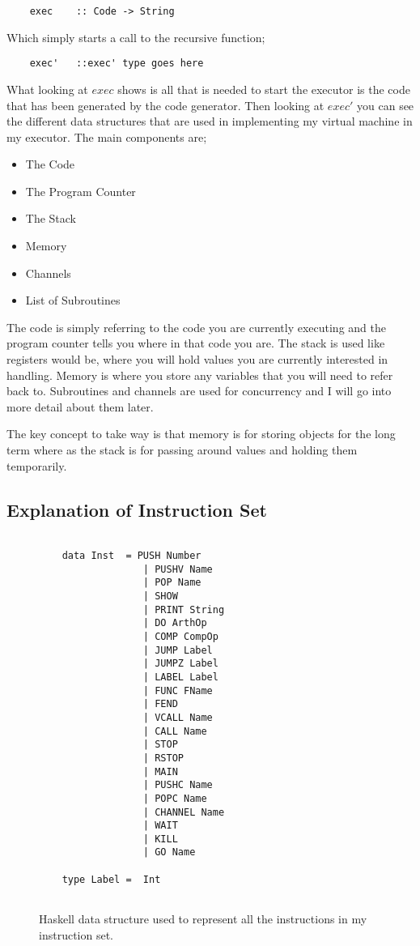 \begin{lstlisting}
	exec	:: Code -> String
\end{lstlisting}

Which simply starts a call to the recursive function;

\begin{lstlisting}
	exec' 	::exec' type goes here 
\end{lstlisting}

\newpage

What looking at $exec$ shows is all that is needed to start the executor is the code that has been generated by the code generator. Then looking at $exec'$ you can see the different data structures that are used in implementing my virtual machine in my executor. The main components are;

\begin{itemize}
\item The Code
\item The Program Counter
\item The Stack
\item Memory
\item Channels
\item List of Subroutines
\end{itemize}

The code is simply referring to the code you are currently executing and the program counter tells you where in that code you are. The stack is used like registers would be, where you will hold values you are currently interested in handling. Memory is where you store any variables that you will need to refer back to. Subroutines and channels are used for concurrency and I will go into more detail about them later. 

The key concept to take way is that memory is for storing objects for the long term where as the stack is for passing around values and holding them temporarily.

\subsection{Explanation of Instruction Set}

\begin{figure}[h]
\centering
\begin{lstlisting}

	data Inst  = PUSH Number
	              | PUSHV Name
	              | POP Name
	              | SHOW
	              | PRINT String  
      		      | DO ArthOp
       		      | COMP CompOp
       		      | JUMP Label
      		      | JUMPZ Label
      		      | LABEL Label
      		      | FUNC FName
      		      | FEND
      		      | VCALL Name
      		      | CALL Name
      		      | STOP
      		      | RSTOP
      		      | MAIN
      		      | PUSHC Name
      		      | POPC Name
      		      | CHANNEL Name
      		      | WAIT
      		      | KILL
      		      | GO Name 
	
	type Label =  Int


\end{lstlisting}
\caption{Haskell data structure used to represent all the instructions in my instruction set.}
\label{fig:instData} 
\end{figure}

